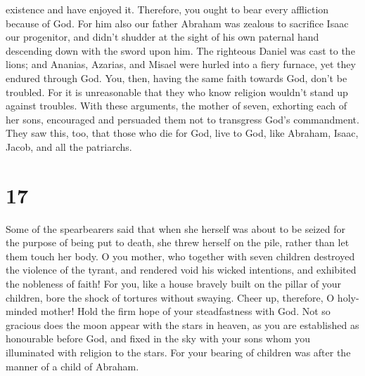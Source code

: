 existence and have enjoyed it.  Therefore, you ought to
bear every affliction because of God.  For him also our
father Abraham was zealous to sacrifice Isaac our progenitor, and didn't
shudder at the sight of his own paternal hand descending down with the
sword upon him.  The righteous Daniel was cast to the
lions; and Ananias, Azarias, and Misael were hurled into a fiery
furnace, yet they endured through God.  You, then, having
the same faith towards God, don't be troubled.  For it is
unreasonable that they who know religion wouldn't stand up against
troubles.  With these arguments, the mother of seven,
exhorting each of her sons, encouraged and persuaded them not to
transgress God's commandment.  They saw this, too, that
those who die for God, live to God, like Abraham, Isaac, Jacob, and all
the patriarchs.

\hypertarget{section-16}{%
\section{17}\label{section-16}}

 Some of the spearbearers said that when she herself was
about to be seized for the purpose of being put to death, she threw
herself on the pile, rather than let them touch her body.  O
you mother, who together with seven children destroyed the violence of
the tyrant, and rendered void his wicked intentions, and exhibited the
nobleness of faith!  For you, like a house bravely built on
the pillar of your children, bore the shock of tortures without swaying.
 Cheer up, therefore, O holy-minded mother! Hold the firm
hope of your steadfastness with God.  Not so gracious does
the moon appear with the stars in heaven, as you are established as
honourable before God, and fixed in the sky with your sons whom you
illuminated with religion to the stars.  For your bearing of
children was after the manner of a child of Abraham.

